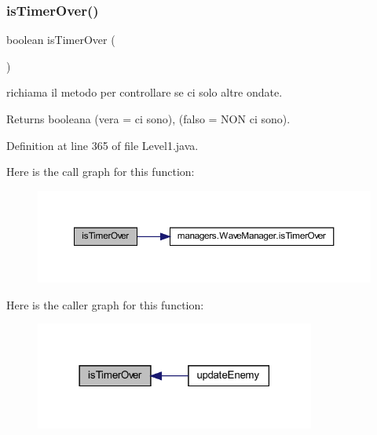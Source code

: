\subsubsection{\texorpdfstring{is\+Timer\+Over()}{isTimerOver()}}
{\footnotesize\ttfamily boolean is\+Timer\+Over (\begin{DoxyParamCaption}{ }\end{DoxyParamCaption})\hspace{0.3cm}{\ttfamily [private]}}



richiama il metodo per controllare se ci solo altre ondate. 

\begin{DoxyReturn}{Returns}
booleana (vera = ci sono), (falso = N\+ON ci sono). 
\end{DoxyReturn}


Definition at line 365 of file Level1.\+java.

Here is the call graph for this function\+:
\nopagebreak
\begin{figure}[H]
\begin{center}
\leavevmode
\includegraphics[width=350pt]{classscenes_1_1_level1_ab68417e6738c05037923f5f0f21eb586_cgraph}
\end{center}
\end{figure}
Here is the caller graph for this function\+:\nopagebreak
\begin{figure}[H]
\begin{center}
\leavevmode
\includegraphics[width=261pt]{classscenes_1_1_level1_ab68417e6738c05037923f5f0f21eb586_icgraph}
\end{center}
\end{figure}
\mbox{\label{classscenes_1_1_level1_aa12eb1084be2c4d9b03d5f248f00900d}} 

